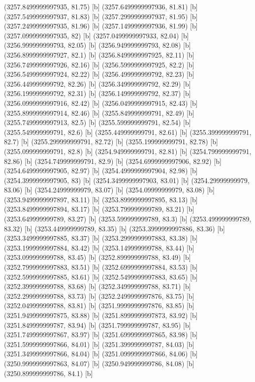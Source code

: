 {{{(3257.8499999997935, 81.75) [b] 
(3257.6499999997936, 81.81) [b] 
(3257.5499999997937, 81.83) [b] 
(3257.2999999997937, 81.95) [b] 
(3257.2499999997935, 81.96) [b] 
(3257.1499999997936, 81.99) [b] 
(3257.0999999997935, 82) [b] 
(3257.0499999997933, 82.04) [b] 
(3256.999999999793, 82.05) [b] 
(3256.949999999793, 82.08) [b] 
(3256.8999999997927, 82.1) [b] 
(3256.8499999997925, 82.11) [b] 
(3256.7499999997926, 82.16) [b] 
(3256.5999999997925, 82.2) [b] 
(3256.5499999997924, 82.22) [b] 
(3256.499999999792, 82.23) [b] 
(3256.449999999792, 82.26) [b] 
(3256.349999999792, 82.29) [b] 
(3256.199999999792, 82.31) [b] 
(3256.149999999792, 82.37) [b] 
(3256.0999999997916, 82.42) [b] 
(3256.0499999997915, 82.43) [b] 
(3255.8999999997914, 82.46) [b] 
(3255.849999999791, 82.49) [b] 
(3255.7499999997913, 82.5) [b] 
(3255.599999999791, 82.54) [b] 
(3255.549999999791, 82.6) [b] 
(3255.449999999791, 82.61) [b] 
(3255.399999999791, 82.7) [b] 
(3255.299999999791, 82.72) [b] 
(3255.199999999791, 82.78) [b] 
(3255.099999999791, 82.8) [b] 
(3254.949999999791, 82.81) [b] 
(3254.799999999791, 82.86) [b] 
(3254.749999999791, 82.9) [b] 
(3254.6999999997906, 82.92) [b] 
(3254.6499999997905, 82.97) [b] 
(3254.4999999997904, 82.98) [b] 
(3254.3999999997905, 83) [b] 
(3254.3499999997903, 83.01) [b] 
(3254.29999999979, 83.06) [b] 
(3254.24999999979, 83.07) [b] 
(3254.09999999979, 83.08) [b] 
(3253.9499999997897, 83.11) [b] 
(3253.8999999997895, 83.13) [b] 
(3253.8499999997894, 83.17) [b] 
(3253.799999999789, 83.21) [b] 
(3253.649999999789, 83.27) [b] 
(3253.599999999789, 83.3) [b] 
(3253.499999999789, 83.32) [b] 
(3253.449999999789, 83.35) [b] 
(3253.3999999997886, 83.36) [b] 
(3253.3499999997885, 83.37) [b] 
(3253.2999999997883, 83.38) [b] 
(3253.1999999997884, 83.42) [b] 
(3253.149999999788, 83.44) [b] 
(3253.099999999788, 83.45) [b] 
(3252.899999999788, 83.49) [b] 
(3252.7999999997883, 83.51) [b] 
(3252.6999999997884, 83.53) [b] 
(3252.5999999997885, 83.61) [b] 
(3252.5499999997883, 83.65) [b] 
(3252.399999999788, 83.68) [b] 
(3252.349999999788, 83.71) [b] 
(3252.299999999788, 83.73) [b] 
(3252.2499999997876, 83.75) [b] 
(3252.049999999788, 83.81) [b] 
(3251.9999999997876, 83.85) [b] 
(3251.9499999997875, 83.88) [b] 
(3251.8999999997873, 83.92) [b] 
(3251.849999999787, 83.94) [b] 
(3251.799999999787, 83.95) [b] 
(3251.7499999997867, 83.97) [b] 
(3251.6999999997865, 83.98) [b] 
(3251.5999999997866, 84.01) [b] 
(3251.399999999787, 84.03) [b] 
(3251.3499999997866, 84.04) [b] 
(3251.0999999997866, 84.06) [b] 
(3250.9999999997863, 84.07) [b] 
(3250.949999999786, 84.08) [b] 
(3250.899999999786, 84.1) [b] 
}}}
